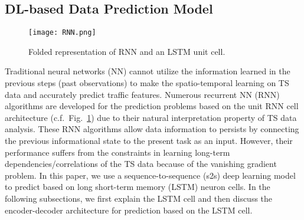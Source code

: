 \documentclass[10pt, conference]{IEEEtran}
\begin{document}
\subsection{DL-based Data Prediction Model}
\label{sec:DLframeworks}
\begin{figure}
\centering
\texttt{[image: RNN.png]}
	\caption{Folded representation of RNN and an LSTM unit cell.}
	\label{fig:RNNInfratructure}
	\vspace{-10pt}
\end{figure}
Traditional neural networks (NN) cannot utilize the information learned in the previous steps (past observations) to make the spatio-temporal learning on TS data and accurately predict traffic features.
Numerous recurrent NN (RNN) algorithms are developed for the prediction problems based on the unit RNN cell architecture (c.f.~Fig.~\ref{fig:RNNInfratructure}) due to their natural interpretation property of TS data analysis. These RNN algorithms allow data information to persists by connecting the previous informational state to the present task as an input. However, their performance suffers from the constraints in learning long-term dependencies/correlations of the TS data because of the vanishing gradient problem. In this paper, we use a sequence-to-sequence (s2s) deep learning model to predict based on long short-term memory (LSTM) neuron cells. In the following subsections, we first explain the LSTM cell and then discuss the encoder-decoder architecture for prediction based on the LSTM cell. 
\end{document}
